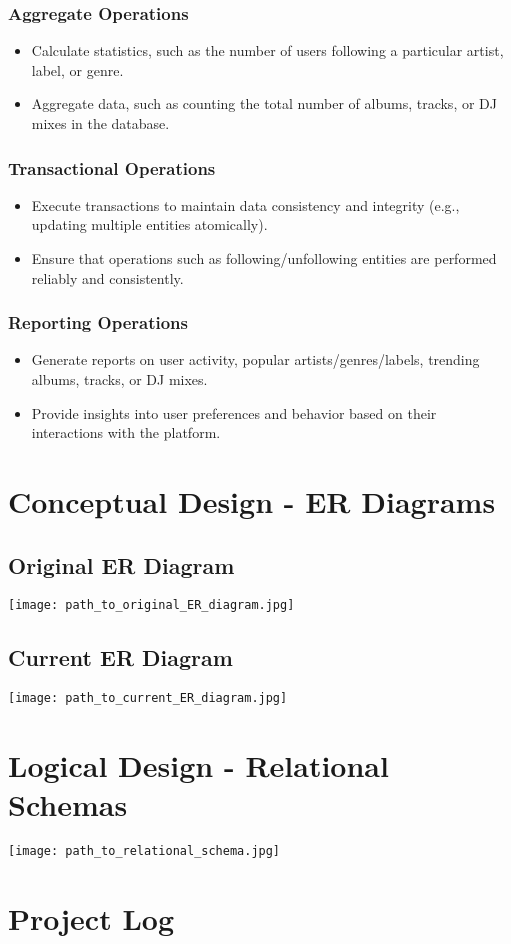 \documentclass{article}
\begin{document}
\subsubsection{Aggregate Operations}
\begin{itemize}
    \item Calculate statistics, such as the number of users following a particular artist, label, or genre.
    \item Aggregate data, such as counting the total number of albums, tracks, or DJ mixes in the database.
\end{itemize}

\subsubsection{Transactional Operations}
\begin{itemize}
    \item Execute transactions to maintain data consistency and integrity (e.g., updating multiple entities atomically).
    \item Ensure that operations such as following/unfollowing entities are performed reliably and consistently.
\end{itemize}

\subsubsection{Reporting Operations}
\begin{itemize}
    \item Generate reports on user activity, popular artists/genres/labels, trending albums, tracks, or DJ mixes.
    \item Provide insights into user preferences and behavior based on their interactions with the platform.
\end{itemize}



\section{Conceptual Design - ER Diagrams}

\subsection{Original ER Diagram}
\texttt{[image: path\_to\_original\_ER\_diagram.jpg]}

\subsection{Current ER Diagram}
\texttt{[image: path\_to\_current\_ER\_diagram.jpg]}

\section{Logical Design - Relational Schemas}

\texttt{[image: path\_to\_relational\_schema.jpg]}


\section{Project Log}

\end{document}

